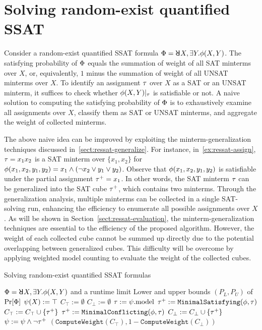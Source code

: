 \section{Solving random-exist quantified SSAT}
\label{sect:ressat-technique}

Consider a random-exist quantified SSAT formula $\Qf=\random{} X,\exists Y.\pf(X,Y)$.
The satisfying probability of $\Phi$ equals the summation of weight of all SAT minterms over $X$, or, equivalently,
$1$ minus the summation of weight of all UNSAT minterms over $X$.
To identify an assignment $\tau$ over $X$ as a SAT or an UNSAT minterm,
it suffices to check whether $\phi(X,Y)|_{\tau}$ is satisfiable or not.
A naive solution to computing the satisfying probability of $\Phi$ is to exhaustively examine all assignments over $X$, classify them as SAT or UNSAT minterms, and aggregate the weight of collected minterms.

The above naive idea can be improved by exploiting the minterm-generalization techniques discussed in~\cref{sect:ressat-generalize}.
For instance, in~\cref{ex:ressat-assign},
$\tau=x_1x_2$ is a SAT minterm over $\{x_1,x_2\}$ for $\phi(x_1,x_2,y_1,y_2)=x_1 \land (\lnot x_2 \lor y_1 \lor y_2)$.
Observe that $\phi(x_1,x_2,y_1,y_2)$ is satisfiable under the partial assignment $\tau^+=x_1$.
In other words, the SAT minterm $\tau$ can be generalized into the SAT cube $\tau^+$, which contains two minterms.
Through the generalization analysis, multiple minterms can be collected in a single SAT-solving run,
enhancing the efficiency to enumerate all possible assignments over $X$.
As will be shown in Section~\ref{sect:ressat-evaluation},
the minterm-generalization techniques are essential to the efficiency of the proposed algorithm.
However, the weight of each collected cube cannot be summed up directly due to the potential overlapping between generalized cubes.
This difficulty will be overcome by applying weighted model counting to evaluate the weight of the collected cubes.

\begin{algorithm}[p]
    \caption{Solving random-exist quantified SSAT formulas}
    \label{alg:ressat}
    \begin{algorithmic}[1]
        \REQUIRE
        $\Qf=\random{} X,\exists Y.\pf(X,Y)$ and a runtime limit \timeout
        \ENSURE
        Lower and upper bounds $(P_L,P_U)$ of $\Pr[\Phi]$
        \STATE $\psi(X) := \top$
        \STATE $C_\top := \emptyset$
        \STATE $C_\bot := \emptyset$
        \STATE $\tau := \psi.\mathrm{model}$
        \IF{($\sat{\pcf{\pf}{\as}}$)}
        \STATE $\tau^+ := \texttt{MinimalSatisfying}(\phi,\tau)$
        \STATE $C_\top := C_\top \cup \{\tau^+\}$
        \ELSE
        \STATE $\tau^+ := \texttt{MinimalConflicting}(\phi,\tau)$
        \STATE $C_\bot := C_\bot \cup \{\tau^+\}$
        \ENDIF
        \STATE $\psi := \psi \land \lnot\tau^+$
        \ENDWHILE
        \RETURN $(\texttt{ComputeWeight}(C_\top),1-\texttt{ComputeWeight}(C_\bot))$
    \end{algorithmic}
\end{algorithm}

